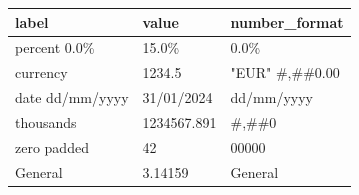 \documentclass[11pt,a4paper]{article}
\begin{document}
\begin{table}[h]
\begin{tabular}{|l|l|l|}
\hline
label & value & number\_format \\ \hline
percent 0.0\% & 15.0\% & 0.0\% \\ \hline
currency & 1234.5 & "EUR" \#,\#\#0.00 \\ \hline
date dd/mm/yyyy & 31/01/2024 & dd/mm/yyyy \\ \hline
thousands & 1234567.891 & \#,\#\#0 \\ \hline
zero padded & 42 & 00000 \\ \hline
General & 3.14159 & General \\ \hline
\end{tabular}
\end{table}
\end{document}

